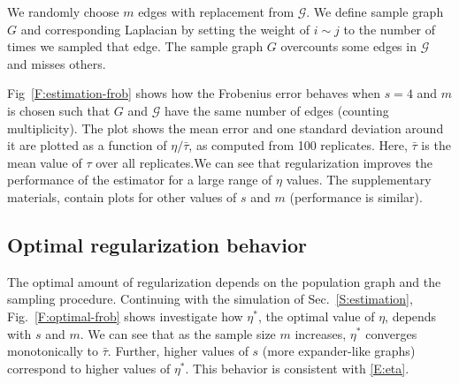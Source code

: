 \documentclass[12pt]{article}
\theoremstyle{plain}
\begin{document}
We randomly choose $m$ edges with replacement from $\mathcal{G}$.  We
define sample graph $G$ and corresponding Laplacian by setting the
weight of $i \sim j$ to the number of times we sampled that edge.  The
sample graph $G$ overcounts some edges in $\mathcal{G}$ and misses
others.

Fig~\ref{F:estimation-frob} shows how the Frobenius error behaves when
$s = 4$ and $m$ is chosen such that $G$ and $\mathcal{G}$ have the
same number of edges (counting multiplicity).  The plot shows the mean
error and one standard deviation around it are plotted as a function
of $\eta/\bar \tau$, as computed from 100 replicates.  Here,
$\bar \tau$ is the mean value of $\tau$ over all replicates.We can see
that regularization improves the performance of the estimator for a
large range of $\eta$ values.  The supplementary materials, contain
plots for other values of $s$ and $m$ (performance is
similar).


\subsection{Optimal regularization behavior}\label{S:optimal}

The optimal amount of regularization depends on the population graph
and the sampling procedure.  Continuing with the simulation of
Sec.~\ref{S:estimation}, Fig.~\ref{F:optimal-frob} shows investigate
how $\eta^\ast$, the optimal value of $\eta$, depends with $s$ and
$m$.  We can see that as the sample size $m$ increases, $\eta^\ast$ converges
monotonically to $\bar \tau$.  Further, higher values of $s$ (more
expander-like graphs) correspond to higher values of $\eta^\ast$.
This behavior is consistent with \eqref{E:eta}.
\end{document}
